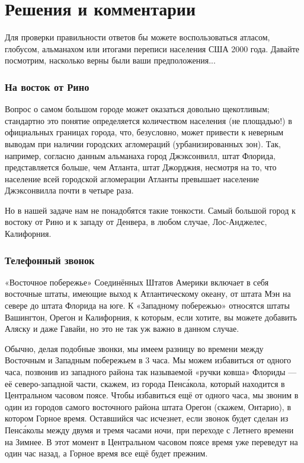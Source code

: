 \section*{Решения и комментарии}


Для проверки правильности ответов  бы можете воспользоваться атласом, глобусом, альманахом  или итогами переписи населения США 2000 года. 
Давайте посмотрим, насколько верны были ваши предположения...


\subsubsection*{На восток от Рино}%


Вопрос о самом большом городе может оказаться довольно щекотливым; 
стандартно  это понятие определяется количеством  населения (не площадью!) в официальных границах города, что, безусловно, может привести к неверным выводам
при наличии  городских агломераций (урбанизированных зон).
Так, например, согласно данным альманаха город Джэксонвилл, штат Флорида, представляется больше, чем Атланта, штат Джорджия,  несмотря на то, что население всей городской агломерации Атланты превышает население Джэксонвилла почти в четыре раза.


Но в нашей задаче нам не понадобятся такие тонкости. Самый большой город к востоку от Рино  и к западу от Денвера, в любом случае, Лос-Анджелес, Калифорния.                                                                                                                                  \heart






\subsubsection*{Телефонный звонок}%


«Восточное побережье»  Соединённых Штатов Америки включает в себя  восточные штаты, имеющие выход к Атлантическому океану,  от штата Мэн на севере до штата Флорида на юге. 
К «Западному  побережью»  относятся штаты Вашингтон, Орегон и Калифорния,
к  которым, если хотите, вы можете добавить Аляску и даже Гавайи,  но это не так уж важно в данном случае. %


Обычно, делая подобные звонки, мы имеем разницу во времени между Восточным и Западным побережьем в 3 часа.  Мы можем избавиться от одного часа, позвонив из  западного района так называемой  «ручки ковша» Флориды --- её северо-западной части, %
скажем, из города Пенс\'акола, который находится в  Центральном часовом поясе.  
Чтобы избавиться ещё от одного часа, мы звоним в один из городов самого  восточного района  штата Орегон (скажем, Онтарио),  в котором Горное время. 
Оставшийся час исчезнет, если звонок будет сделан  из Пенс\'аколы между двумя и тремя часами ночи, при переходе с Летнего времени на Зимнее. 
В этот момент в Центральном часовом поясе время уже переведут на один  час назад, а Горное время все ещё  будет прежним.\heart   


